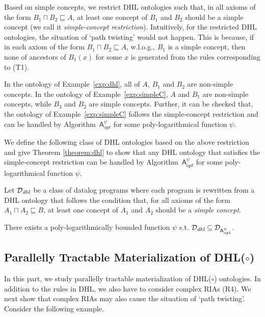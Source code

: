 \documentclass[final,1p,times]{elsarticle}
\begin{document}
Based on simple concepts, we restrict DHL ontologies such that, in all axioms of the
form $B_1\sqcap B_2\sqsubseteq A$, at least one concept of $B_1$ and $B_2$ should be a simple concept
(we call it \emph{simple-concept restriction}).
Intuitively, for the restricted DHL ontologies, the situation of `path twisting' would not happen.
This is because, if in each axiom of the form $B_1\sqcap B_2\sqsubseteq A$, w.l.o.g., $B_1$
is a simple concept, then none of ancestors of $B_1(x)$ for some $x$
is generated from the rules corresponding to (T1).

\begin{example}
In the ontology of Example~\ref{exp:dhl}, all of $A$, $B_1$ and $B_2$ are
non-simple concepts.
In the ontology of Example~\ref{exp:simpleC}, $A$ and $B_1$ are non-simple concepts,
while $B_3$ and $B_2$ are simple concepts. Further, it can be checked that,
the ontology  of Example~\ref{exp:simpleC} follows the simple-concept restriction
and can be handled by Algorithm~$\mathsf{A}_{opt}^\psi$ for some poly-logarithmical function $\psi$.
\end{example}

We define the following class of DHL ontologies based on the above restriction and
give Theorem \ref{theorem:dhl} to show that any DHL ontology that satisfies the
simple-concept restriction can be handled by Algorithm~$\mathsf{A}^\psi_{opt}$
for some poly-logarithmical function $\psi$.

\begin{definition} Let $\mathcal{D}_{\textit{\text{dhl}}}$ be a class of datalog programs where
each program is rewritten from a DHL ontology that follows the condition that, for all axioms of the form
$A_1\sqcap A_2\sqsubseteq B$, at least one concept of $A_1$ and $A_2$ should be a \emph{simple concept}.
\end{definition}

\begin{theorem}\label{theorem:dhl}
There exists a poly-logarithmically bounded function $\psi$ s.t.
$\mathcal{D}_{\textit{\text{dhl}}}\subseteq\mathcal{D}_{\mathsf{A}_{opt}^{\psi}}$.
\end{theorem}


\subsection{Parallelly Tractable Materialization of DHL($\circ$)}

In this part, we study parallelly tractable materialization
of DHL($\circ$) ontologies.
In addition to the rules in DHL, we also have to consider complex RIAs (R4).
We next show that complex RIAs may also cause the situation of `path twisting'.
Consider the following example.
\end{document}
